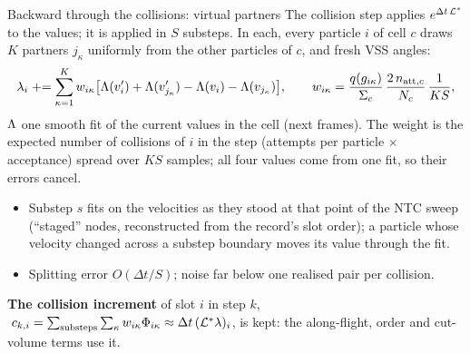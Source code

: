 \begin{frame}{Backward through the collisions: virtual partners}
The collision step applies $e^{\Delta t\,\mathcal L^*}$ to the values; it is applied in $S$ substeps.
In each, every particle $i$ of cell $c$ draws $K$ partners $j_\kappa$ uniformly from the
other particles of $c$, and fresh VSS angles:
\[
\lambda_i \mathrel{+}= \sum_{\kappa=1}^K w_{i\kappa}\big[\Lambda(v_i') + \Lambda(v_{j_\kappa}') - \Lambda(v_i) - \Lambda(v_{j_\kappa})\big],
\qquad
w_{i\kappa} = \frac{q(g_{i\kappa})}{\Sigma_c}\,\frac{2\,n_{\mathrm{att},c}}{N_c}\,\frac{1}{KS},
\]
$\Lambda$ one smooth fit of the current values in the cell (next frames).  The weight is the
expected number of collisions of $i$ in the step (attempts per particle $\times$ acceptance)
spread over $KS$ samples; all four values come from one fit, so their errors cancel.
\begin{itemize}
\item Substep $s$ fits on the velocities as they stood at that point of the NTC sweep
  (``staged'' nodes, reconstructed from the record's slot order); a particle whose
  velocity changed across a substep boundary moves its value through the fit.
\item Splitting error $O(\Delta t/S)$; noise far below one realised pair per collision.
\end{itemize}
\textbf{The collision increment} of slot $i$ in step $k$,
$\;c_{k,i} = \sum_{\text{substeps}}\sum_\kappa w_{i\kappa}\Phi_{i\kappa} \approx \Delta t\,(\mathcal L^*\lambda)_i$,
is kept: the along-flight, order and cut-volume terms use it.
\end{frame}

